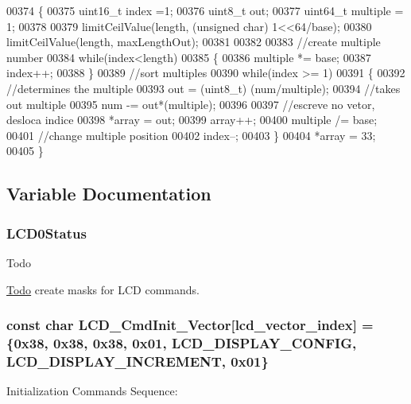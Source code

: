 \begin{DoxyCode}
00374 \{
00375     uint16\_t index =1;
00376     uint8\_t out;
00377     uint64\_t multiple = 1;
00378 
00379     limitCeilValue(length, (\textcolor{keywordtype}{unsigned} \textcolor{keywordtype}{char}) 1<<64/base);
00380     limitCeilValue(length, maxLengthOut);
00381 
00382 
00383     \textcolor{comment}{//create multiple number}
00384     \textcolor{keywordflow}{while}(index<length)
00385     \{
00386         multiple *= base;
00387         index++;
00388     \}
00389     \textcolor{comment}{//sort multiples}
00390     \textcolor{keywordflow}{while}(index >= 1)
00391     \{
00392         \textcolor{comment}{//determines the multiple}
00393         out = (uint8\_t) (num/multiple);
00394         \textcolor{comment}{//takes out multiple}
00395         num -= out*(multiple);
00396 
00397         \textcolor{comment}{//escreve no vetor, desloca indice}
00398         *array = out;
00399         array++;
00400         multiple /= base;
00401         \textcolor{comment}{//change multiple position}
00402         index--;
00403     \}
00404     *array = 33;
00405 \}
\end{DoxyCode}


\subsection{Variable Documentation}
\hypertarget{group__lcd__h_ga8c429a174db0bd2b9972ff4ffa348e41}{
\subsubsection[{L\-C\-D0\-Status}]{ L\-C\-D0\-Status}}\label{group__lcd__h_ga8c429a174db0bd2b9972ff4ffa348e41}
\begin{DoxyRefDesc}{Todo}
\item[\hyperlink{todo__todo000002}{Todo}]create masks for L\-C\-D commands. \end{DoxyRefDesc}
\hypertarget{group__lcd__h_gaf29aec3c2f771e62d84392f6d3fa1427}{
\subsubsection[{L\-C\-D\-\_\-\-Cmd\-Init\-\_\-\-Vector}]{\setlength{\rightskip}{0pt plus 5cm}const char L\-C\-D\-\_\-\-Cmd\-Init\-\_\-\-Vector\mbox{[}{\bf lcd\-\_\-vector\-\_\-index}\mbox{]} =\{0x38, 0x38, 0x38, 0x01, L\-C\-D\-\_\-\-D\-I\-S\-P\-L\-A\-Y\-\_\-\-C\-O\-N\-F\-I\-G, L\-C\-D\-\_\-\-D\-I\-S\-P\-L\-A\-Y\-\_\-\-I\-N\-C\-R\-E\-M\-E\-N\-T, 0x01\}}}\label{group__lcd__h_gaf29aec3c2f771e62d84392f6d3fa1427}
Initialization Commands Sequence\-: 

